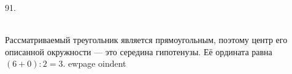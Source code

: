 91. \begin{figure}[ht!]
\end{figure}\\
Рассматриваемый треугольник является прямоугольным, поэтому центр его описанной окружности --- это середина гипотенузы. Её ордината равна $(6+0):2=3.$
ewpage
oindent
